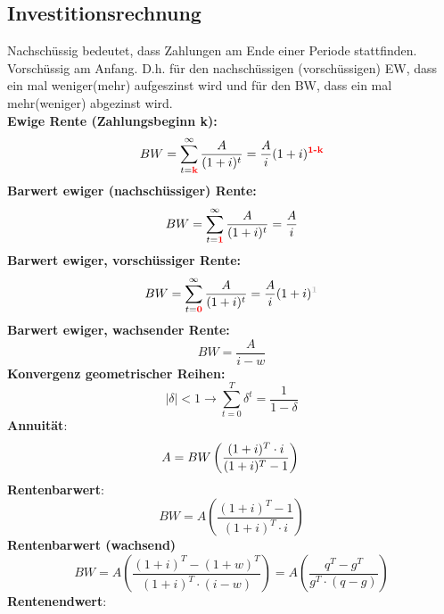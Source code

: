 \documentclass[leqno]{scrartcl}
\begin{document}
\begin{multicols}{4}
\subsection{Investitionsrechnung}

Nachschüssig bedeutet, dass Zahlungen am Ende einer Periode
stattfinden. Vorschüssig am Anfang. D.h. für den nachschüssigen (vorschüssigen) EW, dass ein mal weniger(mehr) aufgeszinst wird und für 
den BW, dass ein mal mehr(weniger) abgezinst wird.\\
\textbf{Ewige Rente (Zahlungsbeginn k):}
  \begin{equation*}
    BW = \sum^{\infty}_{t=\color{red}{\textbf{k}}}\frac{A}{(1+i)^t}=\frac{A}{i}(1+i)^{\color{red}{\textbf{1-k}}}
  \end{equation*}
\textbf{Barwert ewiger (nachschüssiger) Rente:}
  \begin{equation*}
    BW = \sum^{\infty}_{t=\color{red}{\textbf{1}}}\frac{A}{(1+i)^t}=\frac{A}{i}
  \end{equation*}
\textbf{Barwert ewiger, vorschüssiger  Rente:}
  \begin{equation*}
    BW = \sum^{\infty}_{t=\color{red}{\textbf{0}}}\frac{A}{(1+i)^t}=\frac{A}{i}(1+i)^{\color{lightgray}{\textbf{1}}}
  \end{equation*}
\textbf{Barwert ewiger, wachsender Rente:}
  \begin{equation*}
    BW =\frac{A}{i-w}
  \end{equation*}
\textbf{Konvergenz geometrischer Reihen:}
  \begin{equation*}\label{convergence}
    |\delta|<1 \rightarrow \sum^T_{t=0}\delta^t=\frac{1}{1-\delta}
  \end{equation*}
\textbf{Annuität}:\\
  \begin{equation*}
    A = BW \left(\frac{(1+i)^T \cdot i}{(1+i)^T-1}\right)\\
  \end{equation*}
\textbf{Rentenbarwert}:\\
  \begin{equation*}
    BW = A  \left(\frac{(1+i)^T-1}{(1+i)^T \cdot i}\right)
  \end{equation*}
\textbf{Rentenbarwert (wachsend)}\\
  \begin{equation*}
    BW = A  \left(\frac{(1+i)^T-(1+w)^T}{(1+i)^T \cdot (i-w)}\right)= A  \left(\frac{q^T-g^T}{g^T \cdot (q-g)}\right)
  \end{equation*}
\textbf{Rentenendwert}:\\

\end{multicols}
\end{document}
